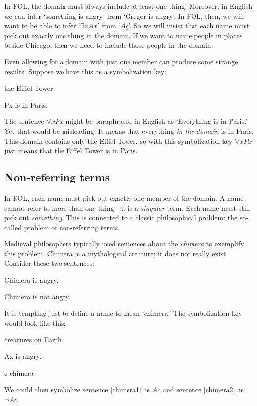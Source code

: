 
In FOL, the domain must always include at least one thing. Moreover, in English we can infer `something is angry' from `Gregor is angry'. In FOL, then, we will want to be able to infer `$\exists x Ax$' from `$Ag$'. So we will insist that each name must pick out exactly one thing in the domain. If we want to name people in places beside Chicago, then we need to include those people in the domain. 

Even allowing for a domain with just one member can produce some strange results. Suppose we have this as a symbolization key:
\begin{ekey}
\item[\text{domain}] the Eiffel Tower
\item[Px]  is in Paris.
\end{ekey}
The sentence $\forall x Px$ might be paraphrased in English as `Everything is in Paris.' Yet that would be misleading. It means that everything \emph{in the domain} is in Paris. This domain contains only the Eiffel Tower, so with this symbolization key $\forall x Px$ just means that the Eiffel Tower is in Paris.

\subsection{Non-referring terms}

In FOL, each name must pick out exactly one member of the domain. A name cannot refer to more than one thing---it is a \emph{singular} term. Each name must still pick out \emph{something}. This is connected to a classic philosophical problem: the so-called problem of non-referring terms.

Medieval philosophers typically used sentences about the \emph{chimera} to exemplify this problem. Chimera is a mythological creature; it does not really exist. Consider these two sentences:
\begin{earg}
\item[\ex{chimera1}] Chimera is angry.
\item[\ex{chimera2}] Chimera is not angry.
\end{earg}
It is tempting just to define a name to mean `chimera.' The symbolization key would look like this:
\begin{ekey}
\item[\text{domain}] creatures on Earth
\item[Ax]  is angry.
\item[c] chimera
\end{ekey}
We could then symbolize sentence \ref{chimera1} as $Ac$ and sentence \ref{chimera2} as $\neg Ac$.

